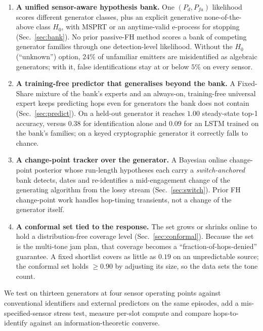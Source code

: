 \documentclass[conference]{IEEEtran}
\begin{document}
\begin{enumerate}
\item \textbf{A unified sensor-aware hypothesis bank.} One $(P_d,P_{fa})$
likelihood scores different
generator classes, plus an explicit generative none-of-the-above class $H_0$, with
MSPRT or an anytime-valid e-process for stopping (Sec.~\ref{sec:bank}). No
prior passive-FH method scores a bank of competing generator families through
one detection-level likelihood. Without the $H_0$ (“unknown”) option, $24\%$ of unfamiliar emitters are misidentified as algebraic generators; with it, false identifications stay at or below $5\%$ on every sensor.

\item \textbf{A training-free predictor that generalises beyond the bank.}
A Fixed-Share mixture of the bank's experts and an always-on, training-free
universal expert keeps predicting hops even for generators the bank does
not contain (Sec.~\ref{sec:predict}). On a held-out generator it reaches
$1.00$ steady-state top-1 accuracy, versus $0.38$ for identification alone
and $0.09$ for an LSTM trained on the bank's families; on a keyed
cryptographic generator it correctly falls to chance.
\item \textbf{A change-point tracker over the generator.} A Bayesian online
change-point posterior whose run-length hypotheses each carry a
\emph{switch-anchored} bank detects, dates and re-identifies a mid-engagement
change of the generating algorithm from the lossy stream (Sec.~\ref{sec:switch}).
Prior FH change-point work handles hop-timing transients, not a change of the
generator itself.

\item \textbf{A conformal set tied to the response.} The set grows or shrinks
online to hold a distribution-free coverage level (Sec.~\ref{sec:conformal}).
Because the set is the multi-tone jam plan, that coverage becomes a
``fraction-of-hops-denied'' guarantee. A fixed shortlist covers as little as
$0.19$ on an unpredictable source; the conformal set holds $\geq 0.90$ by
adjusting its size, so the data sets the tone count.
\end{enumerate}

We test on thirteen generators at four sensor operating points against
conventional identifiers and external predictors on the same episodes, add a
mis-specified-sensor stress test, measure per-slot compute and compare
hops-to-identify against an information-theoretic converse.
\end{document}
